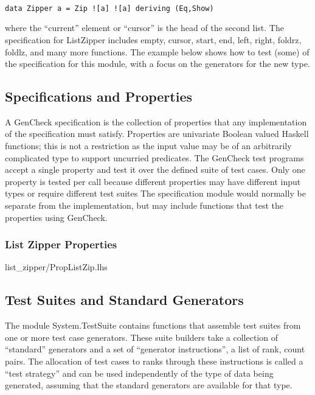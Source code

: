 \begin{verbatim}

data Zipper a = Zip ![a] ![a] deriving (Eq,Show)

\end{verbatim}

where the ``current'' element or ``cursor'' is the head of the second list.
The specification for ListZipper includes empty, cursor, start, end, left, right, foldrz, foldlz, 
and many more functions.  The example below shows how to test (some)
of the specification for this module, with a focus on the generators for the new type.

\subsection{Specifications and Properties}
A GenCheck specification is the collection of properties
that any implementation of the specification must satisfy.
Properties are univariate Boolean valued Haskell functions;
this is not a restriction as the input value may be of an arbitrarily complicated type 
to support uncurried predicates. The GenCheck test programs accept 
a single property and test it over the defined suite of test cases.
Only one property is tested per call because different properties 
may have different input types or require different test suites
The specification module would normally be separate from the implementation,
but may include functions that test the properties using GenCheck.

\subsubsection{List Zipper Properties}

 {list_zipper/PropListZip.lhs}

\subsection{Test Suites and Standard Generators}
The module System.TestSuite contains functions that assemble test suites 
from one or more test case generators. These suite builders take a collection of 
``standard'' generators and a set of ``generator instructions'', a list of rank, count pairs.  
The allocation of test cases to ranks through these instructions is called a ``test strategy'' 
and can be used independently of the type of data being generated, 
assuming that the standard generators are available for that type.


